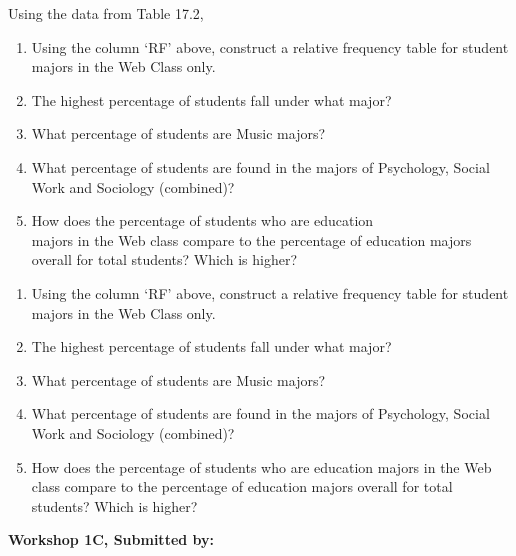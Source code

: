 \documentclass[11pt, chapterprefix=true]{scrbook}\usepackage[]{graphicx}\usepackage[]{color}
\begin{document}
\begin{exercises}
\begin{exercise}
\begin{minipage}[ht]{6cm}
    Using the data from Table 17.2,

\begin{enumerate}
  \item	Using the column `RF' above, construct a relative frequency table for student majors in the Web Class only.
  \item	The highest percentage of students fall under what major?
  \item	What percentage of students are Music majors?
  \item	What percentage of students are found in the majors of Psychology, Social Work and Sociology (combined)?
  \item	How does the percentage of students who are education \\ majors in the Web class compare to the percentage of education majors overall for total students?  Which is higher? 
\end{enumerate}
\end{minipage}
    \end{exercise}
    \begin{solution} %
      
  \begin{enumerate}
  \item	Using the column `RF' above, construct a relative frequency table for student majors in the Web Class only.
  \item	The highest percentage of students fall under what major?
  \item	What percentage of students are Music majors?
  \item	What percentage of students are found in the majors of Psychology, Social Work and Sociology (combined)?
  \item	How does the percentage of students who are education majors in the Web class compare to the percentage of education majors overall for total students?  Which is higher? 
\end{enumerate}
    \end{solution}
    
\clearpage

    \begin{exercise}  %
    
    \begin{center}
\begin{flushleft}\textbf{ \large \hfill Workshop 1C, Submitted by: }\end{flushleft}

\end{center}
\end{exercise}
\end{exercises}
\end{document}
